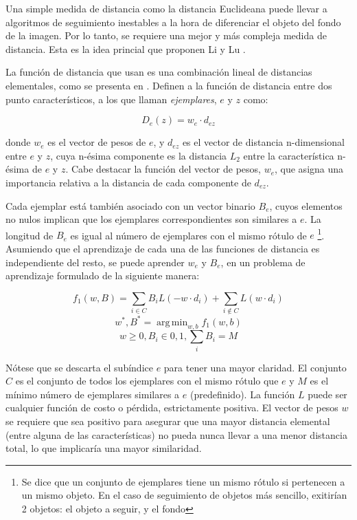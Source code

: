 \documentclass[a4paper,10pt]{article}
\DeclareMathOperator*{\argmin}{arg\,min}
\begin{document}
Una simple medida de distancia como la distancia Euclideana puede llevar a algoritmos
de seguimiento inestables a la hora de diferenciar el objeto del fondo de la imagen. Por
lo tanto, se requiere una mejor y más compleja medida de distancia. Esta 
es la idea princial que proponen Li y Lu \cite{local-learning}.

La función de distancia que usan es una combinación lineal de distancias elementales, 
como se presenta en \cite{malisiewicz-cvpr08}. Definen a la función de distancia entre dos 
punto característicos, a los que llaman \textit{ejemplares}, $e$ y $z$ como:

\begin{equation}
    \label{eq:distance-exemplar}
    D_{e}(z) = w_{e} \cdot d_{ez}
\end{equation}

donde $w_{e}$ es el vector de pesos de $e$, y $d_{ez}$ es el vector de distancia 
n-dimensional entre $e$ y $z$, cuya n-ésima componente es la distancia $L_{2}$ 
entre la característica n-ésima de $e$ y $z$. Cabe destacar la función del vector de pesos, $w_{e}$, 
que asigna una importancia relativa a la distancia de cada componente de $d_{ez}$.

Cada ejemplar está también asociado con un vector binario $B_{e}$, cuyos elementos 
no nulos implican que los ejemplares correspondientes son similares a $e$. La 
longitud de $B_{e}$ es igual al número de ejemplares con el mismo rótulo de $e$
\footnote{Se dice que un conjunto de ejemplares tiene un mismo rótulo si pertenecen a un mismo objeto. En el caso de seguimiento de objetos
más sencillo, exitirían 2 objetos: el objeto a seguir, y el fondo}.
Asumiendo que el aprendizaje de cada una de las funciones de distancia es 
independiente del resto, se puede aprender $w_{e}$ y $B_{e}$, en un problema 
de aprendizaje formulado de la siguiente manera:

\begin{equation}
    \label{eq:learning-problem}
    f_{1}(w,B) = \sum_{i \in C} B_{i}L(-w \cdot d_{i}) + \sum_{i\notin C}L(w \cdot d_{i})
\end{equation}
\begin{equation}
    {w^{*}, B^{*} = \argmin_{w,b} f_{1} (w,b) }
\end{equation}
\begin{equation}
   w \geq 0, B_{i} \in {0,1}, \sum_{i} B_{i} = M
\end{equation}

Nótese que se descarta el subíndice $e$ para tener una mayor claridad.
El conjunto $C$ es el conjunto de todos los ejemplares con el mismo rótulo que $e$ y $M$ 
es el mínimo número de ejemplares similares a $e$ (predefinido). La función $L$ puede ser
cualquier función de costo o pérdida, estrictamente positiva.
El vector de pesos $w$
se requiere que sea positivo para asegurar que una mayor distancia elemental (entre 
alguna de las características) no pueda nunca llevar a una menor distancia total, 
lo que implicaría una mayor similaridad.
\end{document}
